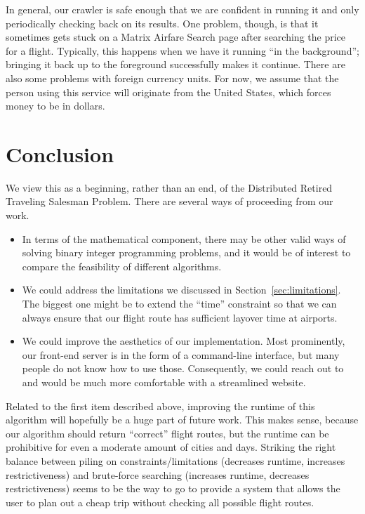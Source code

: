 \documentclass{article}
\begin{document}
In general, our crawler is safe enough that we are confident in running it and only periodically checking back on its results. One problem, though, is
that it sometimes gets stuck on a Matrix Airfare Search page after searching the price for a flight. Typically, this happens when we have it running
``in the background''; bringing it back up to the foreground successfully makes it continue. There are also some problems with foreign currency units.
For now, we assume that the person using this service will originate from the United States, which forces money to be in dollars.


\section{Conclusion}\label{sec:conclusion}

We view this as a beginning, rather than an end, of the Distributed Retired Traveling Salesman Problem. There are several ways of proceeding from our
work.

\begin{itemize}[noitemsep]
    \item In terms of the mathematical component, there may be other valid ways of solving binary integer programming problems, and it would be of
    interest to compare the feasibility of different algorithms.
    \item We could address the limitations we discussed in Section~\ref{sec:limitations}. The biggest one might be to extend the ``time'' constraint
    so that we can always ensure that our flight route has sufficient layover time at airports.
    \item We could improve the aesthetics of our implementation. Most prominently, our front-end server is in the form of a command-line interface,
    but many people do not know how to use those. Consequently, we could reach out to and would be much more comfortable with a streamlined website.
\end{itemize}

Related to the first item described above, improving the runtime of this algorithm will hopefully be a huge part of future work. This makes sense,
because our algorithm should return ``correct'' flight routes, but the runtime can be prohibitive for even a moderate amount of cities and days.
Striking the right balance between piling on constraints/limitations (decreases runtime, increases restrictiveness) and brute-force searching
(increases runtime, decreases restrictiveness) seems to be the way to go to provide a system that allows the user to plan out a cheap trip without
checking all possible flight routes.
\end{document}
